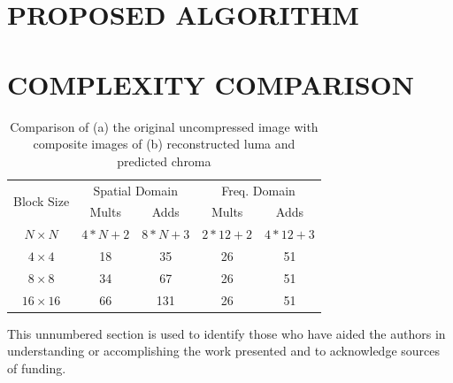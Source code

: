 \documentclass[a4paper]{spie}  %
\begin{document}
\section{PROPOSED ALGORITHM}
\label{sec:alg}

\section{COMPLEXITY COMPARISON}

\begin{table}
\begin{center}
\begin{tabular}{|c|c|c|c|c|}
\hline
\multirow{2}{*}{Block Size} & \multicolumn{2}{|c|}{Spatial Domain} & \multicolumn{2}{|c|}{Freq. Domain} \\
\cline{2-5}
 & Mults & Adds & Mults & Adds \\
\hline
$N\times N$ & $4*N+2$ & $8*N+3$ & $2*12+2$ & $4*12+3$ \\
\hline
$4\times 4$ & 18 & 35 & 26 & 51 \\
\hline
$8\times 8$ & 34 & 67 & 26 & 51 \\
\hline
$16\times 16$\footnotemark[1] & 66 & 131 & 26 & 51 \\
\hline
\end{tabular}
\end{center}
\caption[example]{\label{fig:comp} Comparison of (a) the original uncompressed
 image with composite images of (b) reconstructed luma and predicted chroma}
\end{table}
\cite{valin2013high}

\acknowledgments     %
 
This unnumbered section is used to identify those who have aided the authors in understanding or accomplishing the work presented and to acknowledge sources of funding.  


\end{document}
